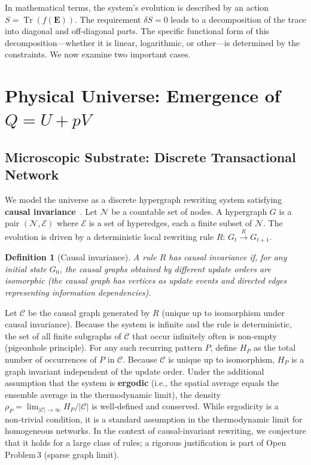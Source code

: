 \documentclass{article}
\newtheorem{definition}[theorem]{Definition}
\begin{document}
In mathematical terms, the system’s evolution is described by an action $S = \operatorname{Tr}(f(\mathbf{E}))$. The requirement $\delta S = 0$ leads to a decomposition of the trace into diagonal and off‑diagonal parts. The specific functional form of this decomposition—whether it is linear, logarithmic, or other—is determined by the constraints. We now examine two important cases.

\section{Physical Universe: Emergence of $Q = U + pV$}
\subsection{Microscopic Substrate: Discrete Transactional Network}
We model the universe as a discrete hypergraph rewriting system satisfying \textbf{causal invariance}~\cite{wolfram}. Let $\mathcal{N}$ be a countable set of nodes. A hypergraph $G$ is a pair $(\mathcal{N}, \mathcal{E})$ where $\mathcal{E}$ is a set of hyperedges, each a finite subset of $\mathcal{N}$. The evolution is driven by a deterministic local rewriting rule $R$: $G_t \xrightarrow{R} G_{t+1}$.

\begin{definition}[Causal invariance]
A rule $R$ has causal invariance if, for any initial state $G_0$, the causal graphs obtained by different update orders are isomorphic (the causal graph has vertices as update events and directed edges representing information dependencies).
\end{definition}

Let $\mathcal{C}$ be the causal graph generated by $R$ (unique up to isomorphism under causal invariance). Because the system is infinite and the rule is deterministic, the set of all finite subgraphs of $\mathcal{C}$ that occur infinitely often is non‑empty (pigeonhole principle). For any such recurring pattern $P$, define $H_P$ as the total number of occurrences of $P$ in $\mathcal{C}$. Because $\mathcal{C}$ is unique up to isomorphism, $H_P$ is a graph invariant independent of the update order. Under the additional assumption that the system is \textbf{ergodic} (i.e., the spatial average equals the ensemble average in the thermodynamic limit), the density $\rho_P = \lim_{|\mathcal{C}|\to\infty} H_P / |\mathcal{C}|$ is well‑defined and conserved. While ergodicity is a non‑trivial condition, it is a standard assumption in the thermodynamic limit for homogeneous networks. In the context of causal‑invariant rewriting, we conjecture that it holds for a large class of rules; a rigorous justification is part of Open Problem 3 (sparse graph limit).
\end{document}

